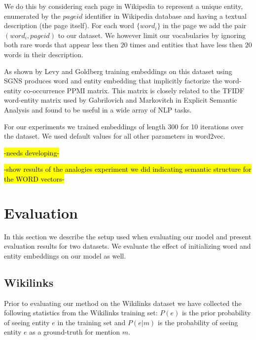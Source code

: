 \documentclass[11pt]{article}
\begin{document}
We do this by considering each page in Wikipedia to represent a unique entity, enumerated by the $pageid$ identifier in Wikipedia database and having a textual description (the page itself). For each word $\{word_i\}$ in the page we add the pair $(word_i,pageid)$ to our dataset. We however limit our vocabularies by ignoring both rare words that appear less then $20$ times and entities that have less then $20$ words in their description.
	
As shown by Levy and Goldberg  training embeddings on this dataset using SGNS produces word and entity embedding that implicitly factorize the word-entity co-occurrence PPMI matrix. This matrix is closely related to the TFIDF word-entity matrix used by Gabrilovich and Markovitch  in Explicit Semantic Analysis and found to be useful in a wide array of NLP tasks. 

For our experiments we trained embeddings of length 300 for 10 iterations over the dataset. We used default values for all other parameters in word2vec.

\hl{-needs developing-}

\hl{-show results of the analogies experiment we did indicating semantic structure for the WORD vectors-}

\section{Evaluation} \label{experiments}

In this section we describe the setup used when evaluating our model and present evaluation results for two datasets. We evaluate the effect of initializing word and entity embeddings on our model as well.

\subsection{Wikilinks}

Prior to evaluating our method on the Wikilinks dataset we have collected the following statistics from the Wikilinks training set: $P(e)$ is the prior probability of seeing entity $e$ in the training set and $P(e|m)$ is the probability of seeing entity $e$ as a ground-truth for mention $m$. 
\end{document}
